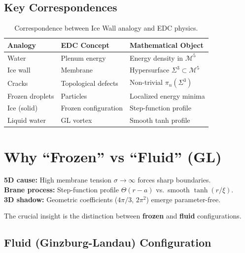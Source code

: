 \subsection{Key Correspondences}

\begin{table}[H]
\centering
\begin{tabular}{lll}
\toprule
\textbf{Analogy} & \textbf{EDC Concept} & \textbf{Mathematical Object} \\
\midrule
Water & Plenum energy & Energy density in $\mathcal{M}^5$ \\
Ice wall & Membrane & Hypersurface $\Sigma^3 \subset \mathcal{M}^5$ \\
Cracks & Topological defects & Non-trivial $\pi_n(\Sigma^3)$ \\
Frozen droplets & Particles & Localized energy minima \\
Ice (solid) & Frozen configuration & Step-function profile \\
Liquid water & GL vortex & Smooth tanh profile \\
\bottomrule
\end{tabular}
\caption{Correspondence between Ice Wall analogy and EDC physics.}
\label{tab:ch2_ice_wall_correspondence}
\end{table}


\section{Why ``Frozen'' vs ``Fluid'' (GL)}
\label{sec:ch2_frozen_vs_gl}

\begin{tcolorbox}[colback=gray!5!white, colframe=gray!50!black,
    title=\textbf{5D Cause → 3D Shadow}]
\textbf{5D cause:} High membrane tension $\sigma \to \infty$ forces sharp boundaries.\\
\textbf{Brane process:} Step-function profile $\Theta(r-a)$ vs.\ smooth $\tanh(r/\xi)$.\\
\textbf{3D shadow:} Geometric coefficients ($4\pi/3$, $2\pi^2$) emerge parameter-free.
\end{tcolorbox}

The crucial insight is the distinction between \textbf{frozen} and \textbf{fluid} configurations.

\subsection{Fluid (Ginzburg-Landau) Configuration}

